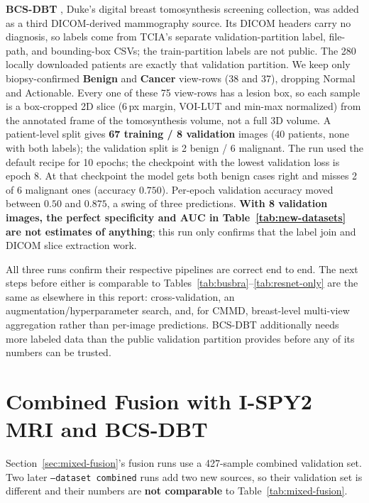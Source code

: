 \documentclass[11pt]{article}
\begin{document}
\textbf{BCS-DBT} \citep{buda2021bcsdbt}, Duke's digital breast
tomosynthesis screening collection, was added as a third DICOM-derived
mammography source. Its DICOM headers carry no diagnosis, so labels come
from TCIA's separate validation-partition label, file-path, and
bounding-box CSVs; the train-partition labels are not public. The 280
locally downloaded patients are exactly that validation partition. We keep
only biopsy-confirmed \textbf{Benign} and \textbf{Cancer} view-rows (38 and
37), dropping Normal and Actionable. Every one of these 75 view-rows has a
lesion box, so each sample is a box-cropped 2D slice (6\,px margin, VOI-LUT
and min-max normalized) from the annotated frame of the tomosynthesis
volume, not a full 3D volume. A patient-level split gives \textbf{67
training / 8 validation} images (40 patients, none with both labels); the
validation split is 2 benign / 6 malignant. The run used the default
recipe for 10 epochs; the checkpoint with the lowest validation loss is
epoch 8. At that checkpoint the model gets both benign cases right and
misses 2 of 6 malignant ones (accuracy $0.750$). Per-epoch validation
accuracy moved between $0.50$ and $0.875$, a swing of three predictions.
\textbf{With 8 validation images, the perfect specificity and AUC in
Table~\ref{tab:new-datasets} are not estimates of anything}; this run only
confirms that the label join and DICOM slice extraction work.

All three runs confirm their respective pipelines are correct end to end. The
next steps before either is comparable to
Tables~\ref{tab:busbra}--\ref{tab:resnet-only} are the same as elsewhere in
this report: cross-validation, an augmentation/hyperparameter search, and,
for CMMD, breast-level multi-view aggregation rather than per-image
predictions. BCS-DBT additionally needs more labeled data than the public
validation partition provides before any of its numbers can be trusted.

\section{Combined Fusion with I-SPY2 MRI and BCS-DBT}
\label{sec:combined-ispy2}

Section~\ref{sec:mixed-fusion}'s fusion runs use a 427-sample combined
validation set. Two later \texttt{--dataset combined} runs add two new
sources, so their validation set is different and their numbers are
\textbf{not comparable} to Table~\ref{tab:mixed-fusion}.
\end{document}
